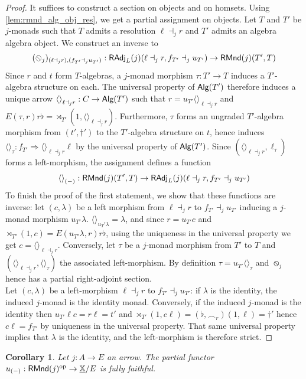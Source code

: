 \documentclass[10pt,a4paper]{article}
\newcommand{\bb}[1]{\mathbb{#1}}
\newcommand{\cat}[1]{\textcat{#1}}
\newcommand{\textcat}[1]{{\normalfont\textsf{#1}}}
\newcommand{\To}{\Rightarrow}
\newcommand{\op}{\mathrm{op}}
\newcommand{\tp}[1]{\langle#1\rangle}
\newcommand{\unit}{{\tp{}}}
\DeclareMathOperator{\Alg}{\cat{Alg}}
\theoremstyle{plain}
\newtheorem{corollary}[theorem]{Corollary}
\theoremstyle{definition}
\theoremstyle{remark}
\begin{document}
\begin{proof}
    It suffices to construct a section on objects and on homsets. Using \ref{lem:rmnd_alg_obj_res}, we get a partial assignment on objects. Let $T$ and $T'$ be $j$-monads such that $T$ admits a resolution $\ell\dashv_jr$ and $T'$ admits an algebra algebra object. We construct an inverse to
    $$(\obslash_j)_{(\ell\dashv_jr), (f_{T'}\dashv_ju_{T'})} : \cat{RAdj}_L(j)(\ell\dashv_jr, f_{T'}\dashv_ju_{T'}) \to \cat{RMnd}(j)(T', T)$$
    Since $r$ and $t$ form $T$-algebras, a $j$-monad morphism $\tau : T' \to T$ induces a $T'$-algebra structure on each. The universal property of $\Alg(T')$ therefore induces a unique arrow $\unit_{\ell\dashv_jr} : C\to\Alg(T')$ such that $r=u_{T'}\unit_{\ell\dashv_jr}$ and $E(\tau, r)r\flat = \rtimes_{T'}(1, \unit_{\ell\dashv_jr})$. Furthermore, $\tau$ forms an ungraded $T'$-algebra morphism from $(t', \dag')$ to the $T'$-algebra structure on $t$, hence induces $\unit_\tau : f_{T'} \To \unit_{\ell\dashv_jr}\ell$ by the universal property of $\Alg(T')$. Since $(\unit_{\ell\dashv_jr}, \ell_\tau)$ forms a left-morphism, the assignment defines a function
    \[
        \unit_{(-)} : \cat{RMnd}(j)(T', T) \to \cat{RAdj}_L(j)(\ell\dashv_jr, f_{T'}\dashv_ju_{T'})
    \]
    To finish the proof of the first statement, we show that these functions are inverse: let $(c, \lambda)$ be a left morphism from $\ell\dashv_jr$ to $f_{T'}\dashv_ju_{T'}$ inducing a $j$-monad morphism $u_{T'}\lambda$. $\unit_{u_T'\lambda}=\lambda$, and since $r=u_{T'}c$ and $\rtimes_{T'}(1, c) = E(u_{T'}\lambda, r)r\flat$, using the uniqueness in the universal property we get $c = \unit_{\ell\dashv_jr}$. Conversely, let $\tau$ be a $j$-monad morphism from $T'$ to $T$ and $(\unit_{\ell\dashv_jr}, \unit_\tau)$ the associated left-morphism. By definition $\tau = u_{T'}\unit_\tau$ and $\obslash_j$ hence has a partial right-adjoint section.\\
    Let $(c, \lambda)$ be a left-morphism $\ell\dashv_jr$ to $f_{T'}\dashv_j u_{T'}$: if $\lambda$ is the identity, the induced $j$-monad is the identity monad. Conversely, if the induced $j$-monad is the identity then $u_{T'}\ell c = r\ell = t'$ and $\rtimes_{T'}(1, c\ell) = (\flat, \smallfrown_r)(1, \ell) = \dag'$ hence $c\ell = f_{T'}$ by uniqueness in the universal property. That same universal property implies that $\lambda$ is the identity, and the left-morphism is therefore strict.
\end{proof}

\begin{corollary}
    Let $j : A \to E$ an arrow. The partial functor $u_{(-)} : \cat{RMnd}(j)^\op \to \underline{\bb X}/E$ is fully faithful.
\end{corollary}
\end{document}
